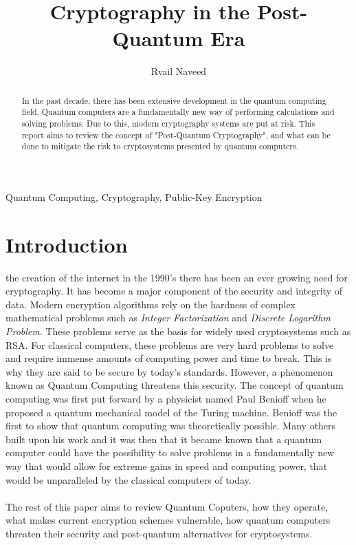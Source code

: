 \documentclass[journal]{IEEEtran}
\begin{document}
\title{Cryptography in the Post-Quantum Era}


\author{Rvail Naveed}

\maketitle


\begin{abstract} %
In the past decade, there has been extensive development in the quantum computing field. 
Quantum computers are a fundamentally new way of performing calculations and solving problems. 
Due to this, modern cryptography systems are put at risk. This report aims to review the concept of "Post-Quantum Cryptography", 
and what can be done to mitigate the risk to cryptosystems presented by quantum computers.  
\end{abstract}

\begin{IEEEkeywords}
Quantum Computing, Cryptography, Public-Key Encryption
\end{IEEEkeywords}


\section{Introduction}

 the creation of the internet in the 1990's there has been an ever growing need for cryptography. 
It has become a major component of the security and integrity of data. Modern encryption algorithms rely on the hardness of complex 
mathematical problems such as \emph{Integer Factorization} and \emph{Discrete Logarithm Problem}. These problems serve as the basis for widely used cryptosystems such as RSA. 
For classical computers, these problems are very hard problems to solve and require immense amounts of computing power and time to break. 
This is why they are said to be secure by today's standards. However, a phenomenon known as Quantum Computing threatens this security. 
The concept of quantum computing was first put forward by a physicist named Paul Benioff when he proposed a quantum mechanical model of the Turing machine. 
Benioff was the first to show that quantum computing was theoretically possible. Many others built upon his work and it was then that it became known that a 
quantum computer could have the possibility to solve problems in a fundamentally new way that would allow for extreme gains in speed and computing power, 
that would be unparalleled by the classical computers of today.
\\ \\
The rest of this paper aims to review Quantum Coputers, how they operate, what makes current encryption schemes vulnerable,
how quantum computers threaten their security and post-quantum alternatives for cryptosystems.
\end{document}
